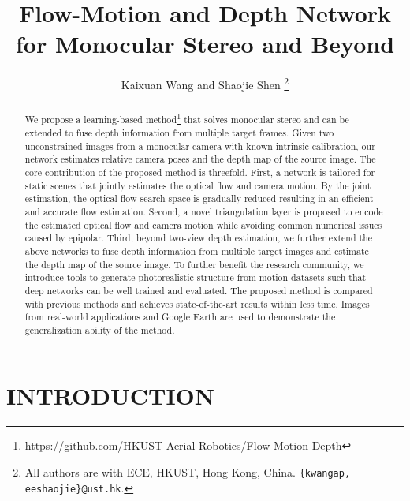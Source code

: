 \documentclass[letterpaper, 10 pt, conference]{ieeeconf}  %
\title{\LARGE \bf
Flow-Motion and Depth Network for Monocular Stereo and Beyond}
\author{Kaixuan Wang and Shaojie Shen%
\thanks{All authors are with  ECE, HKUST, Hong Kong, China. {\tt\small \{kwangap, eeshaojie\}@ust.hk}.
}}
\begin{document}
 
 
\maketitle
\thispagestyle{empty} %
\pagestyle{empty}
 
 
 
 
\begin{abstract}
We propose a learning-based method\footnote{https://github.com/HKUST-Aerial-Robotics/Flow-Motion-Depth} that solves monocular stereo and can be extended to fuse depth information from multiple target frames. Given two unconstrained images from a monocular camera with known intrinsic calibration, our network estimates relative camera poses and the depth map of the source image. The core contribution of the proposed method is threefold. First, a network is tailored for static scenes that jointly estimates the optical flow and camera motion. By the joint estimation, the optical flow search space is gradually reduced resulting in an efficient and accurate flow estimation. Second, a novel triangulation layer is proposed to encode the estimated optical flow and camera motion while avoiding common numerical issues caused by epipolar. Third, beyond two-view depth estimation, we further extend the above networks to fuse depth information from multiple target images and estimate the depth map of the source image. To further benefit the research community, we introduce tools to generate photorealistic structure-from-motion datasets such that deep networks can be well trained and evaluated. The proposed method is compared with previous methods and achieves state-of-the-art results within less time. Images from real-world applications and Google Earth are used to demonstrate the generalization ability of the method.
\end{abstract}

\section{INTRODUCTION}
\end{document}
